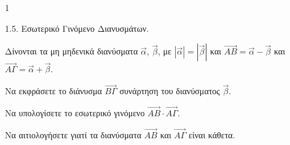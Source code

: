 \begin{ylh}{1}
    \item 1.5. Εσωτερικό Γινόμενο Διανυσμάτων.
\end{ylh}
Δίνονται τα μη μηδενικά διανύσματα $\vec{\alpha}$, $\vec{\beta}$, με $|\vec{\alpha}| = |\vec{\beta}|$ και $\vec{AB} = \vec{\alpha} - \vec{\beta}$ και $\vec{A\Gamma} = \vec{\alpha} + \vec{\beta}$.
\begin{alist}
\item Να εκφράσετε το διάνυσμα $\vec{B\Gamma}$ συνάρτηση του διανύσματος $\vec{\beta}$. 
\item Να υπολογίσετε το εσωτερικό γινόμενο $\vec{AB} \cdot \vec{A\Gamma}$. 
\item Να αιτιολογήσετε γιατί τα διανύσματα $\vec{AB}$ και $\vec{A\Gamma}$ είναι κάθετα. 
\end{alist}